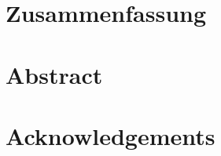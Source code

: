 \pagestyle{headings}

\section*{Zusammenfassung}

\clearpage

\section*{Abstract}


\clearpage

\section*{Acknowledgements}

\clearpage
\renewcommand\pagemark{\usekomafont{pagenumber}\thepage}
\setcounter{tocdepth}{1}
\tableofcontents
